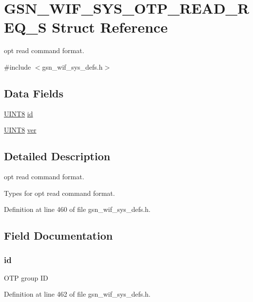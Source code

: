 \hypertarget{a00358}{
\section{GSN\_\-WIF\_\-SYS\_\-OTP\_\-READ\_\-REQ\_\-S Struct Reference}
\label{a00358}
}


opt read command format.  




{\ttfamily \#include $<$gsn\_\-wif\_\-sys\_\-defs.h$>$}

\subsection*{Data Fields}
\begin{DoxyCompactItemize}
\item 
\hyperlink{a00660_gab27e9918b538ce9d8ca692479b375b6a}{UINT8} \hyperlink{a00358_a583a14d715339a2c22d205223d366263}{id}
\item 
\hyperlink{a00660_gab27e9918b538ce9d8ca692479b375b6a}{UINT8} \hyperlink{a00358_a2ac44d771c9e31ef7508150a7082e8cf}{ver}
\end{DoxyCompactItemize}


\subsection{Detailed Description}
opt read command format. 

Types for opt read command format. 

Definition at line 460 of file gsn\_\-wif\_\-sys\_\-defs.h.



\subsection{Field Documentation}
\hypertarget{a00358_a583a14d715339a2c22d205223d366263}{
\subsubsection[{id}]{ {\bf id}}}
\label{a00358_a583a14d715339a2c22d205223d366263}
OTP group ID 

Definition at line 462 of file gsn\_\-wif\_\-sys\_\-defs.h.

